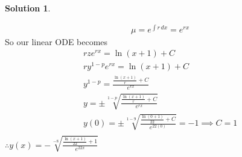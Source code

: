 \documentclass[10pt]{article}
\theoremstyle{definition}
\newtheorem{soln}{Solution}
\begin{document}
\begin{soln}
\begin{enumerate}[label=(\alph*)]
          \begin{align*}
             & \mu = e^{\int r\,dx}=e^{rx}
          \end{align*}
          So our linear ODE becomes
          \begin{align*}
             & rze^{rx}= \ln(x+1) + C                                                        \\
             & ry^{1-p}e^{rx}= \ln(x+1) + C                                                  \\
             & y^{1-p}= \frac{\frac{\ln(x+1)}{r} + C}{e^{rx}}                                \\
             & y= \pm\sqrt[1-p]{\frac{\frac{\ln(x+1)}{r} + C}{e^{rx}}}                       \\
             & y(0)= \pm\sqrt[1-9]{\frac{\frac{\ln(0+1)}{22} + C}{e^{22(0)}}}=-1\implies C=1 \\
          \end{align*}
          $\therefore y(x)=\displaystyle-\sqrt[-8]{\frac{\frac{\ln(x+1)}{22} + 1}{e^{22x}}}$
  \end{enumerate}
\end{soln}
\end{document}
